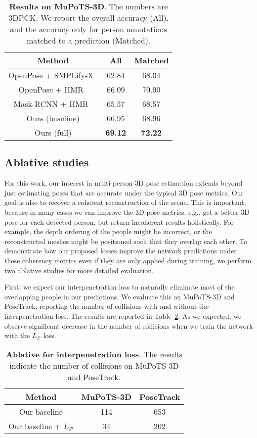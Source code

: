 \begin{table}\centering
	\begin{tabular}{c|c|c}
	\toprule
	Method & All & Matched\\
	\midrule	
	OpenPose + SMPLify-X~\cite{pavlakos2019expressive} & 62.84 & 68.04\\
	OpenPose + HMR~\cite{kanazawa2018end} & 66.09 & 70.90\\	
	Mask-RCNN + HMR~\cite{kanazawa2018end} & 65.57 & 68.57\\			
	Ours (baseline) & 66.95 & 68.96\\	
	Ours (full) & \textbf{69.12} & \textbf{72.22}\\
	\bottomrule
	\end{tabular}
	\caption{\textbf{Results on MuPoTS-3D}. The numbers are 3DPCK. We report the overall accuracy (All), and the accuracy only for person annotations matched to a prediction (Matched).}
	\label{table:mupots}
\end{table}

\subsection{Ablative studies} \label{sec:ablatives}
For this work, our interest in multi-person 3D pose estimation extends beyond just estimating poses that are accurate under the typical 3D pose metrics. Our goal is also to recover a coherent reconstruction of the scene. This is important, because in many cases we can improve the 3D pose metrics, e.g., get a better 3D pose for each detected person, but return incoherent results holistically. For example, the depth ordering of the people might be incorrect, or the reconstructed meshes might be positioned such that they overlap each other. To demonstrate how our proposed losses improve the network predictions under these coherency metrics even if they are only applied during training, we perform two ablative studies for more detailed evaluation.

First, we expect our interpenetration loss to naturally eliminate most of the overlapping people in our predictions. We evaluate this on MuPoTS-3D and PoseTrack, reporting the number of collisions with and without the interpenetration loss. The results are reported in Table~\ref{table:interpenetration}. As we expected, we observe significant decrease in the number of collisions when we train the network with the $L_{\mathcal{P}}$ loss.

\begin{table}\centering
	\begin{tabular}{c|c|c}
		\toprule
		Method & MuPoTS-3D & PoseTrack \\
		\midrule
	    Our baseline & 114 & 653 \\
	    Our baseline + $L_{\mathcal{P}}$  & 34 & 202 \\
		\bottomrule
	\end{tabular}
	\caption{\textbf{Ablative for interpenetration loss}. The results indicate the number of collisions on MuPoTS-3D and PoseTrack.}
	\vspace{-2mm}
	\label{table:interpenetration}
\end{table}

